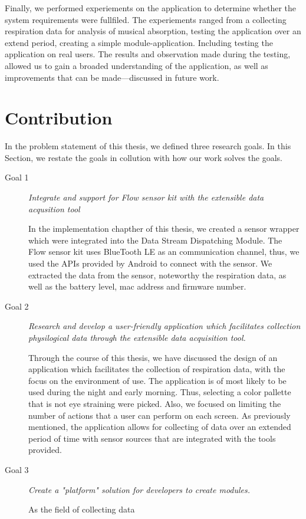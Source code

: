 Finally, we performed experiements on the application to determine whether the system requirements were fullfiled. The experiements ranged from a collecting respiration data for analysis of musical absorption, testing the application over an extend period, creating a simple module-application. Including testing the application on real users. The results and observation made during the testing, allowed us to gain a broaded understanding of the application, as well as improvements that can be made---discussed in future work. 

\section{Contribution}
In the problem statement of this thesis, we defined three research goals. In this Section, we restate the goals in collution with how our work solves the goals. 

\begin{description}
    \item[Goal 1] \textit{Integrate and support for Flow sensor kit with the extensible data acqusition tool}

    In the implementation chapther of this thesis, we created a sensor wrapper which were integrated into the Data Stream Dispatching Module. The Flow sensor kit uses BlueTooth LE as an communication channel, thus, we used the APIs provided by Android to connect with the sensor. We extracted the data from the sensor, noteworthy the respiration data, as well as the battery level, mac address and firmware number. 

    \item[Goal 2] \textit{Research and develop a user-friendly application which facilitates collection physilogical data through the extensible data acquisition tool.}


    Through the course of this thesis, we have discussed the design of an application which facilitates the collection of respiration data, with the focus on the environment of use. The application is of most likely to be used during the night and early morning. Thus, selecting a color pallette that is not eye straining were picked. Also, we focused on limiting the number of actions that a user can perform on each screen. As previously mentioned, the application allows for collecting of data over an extended period of time with sensor sources that are integrated with the tools provided. 


    \item[Goal 3] \textit{Create a "platform" solution for developers to create modules.}

    As the field of collecting data 
\end{description}

